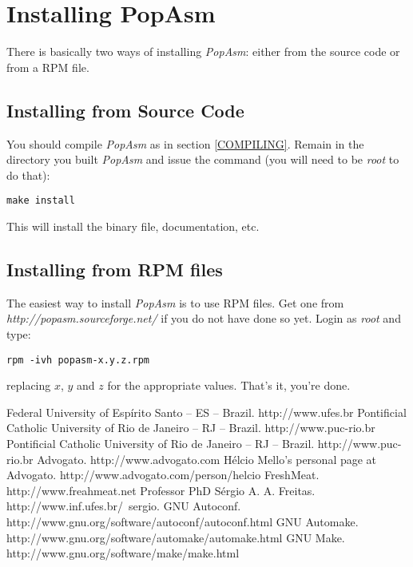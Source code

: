 \documentclass[a4paper,12pt]{book}
\begin{document}
\section{Installing PopAsm}

There is basically two ways of installing \emph{PopAsm}: either from the source code or from a
RPM file.

\subsection{Installing from Source Code}
You should compile \emph{PopAsm} as in section \ref{COMPILING}. Remain in the directory you built
\emph{PopAsm} and issue the command (you will need to be \emph{root} to do that):

\begin{verbatim}
make install
\end{verbatim}

This will install the binary file, documentation, etc.

\subsection{Installing from RPM files}
The easiest way to install \emph{PopAsm} is to use RPM files. Get one from
\emph{http://popasm.sourceforge.net/} if you do not have done so yet. Login as \emph{root} and
type:

\begin{verbatim}
rpm -ivh popasm-x.y.z.rpm
\end{verbatim}

replacing $x$, $y$ and $z$ for the appropriate values. That's it, you're done.

\begin{thebibliography}{9}
 Federal University of Esp\'irito Santo -- ES -- Brazil. http://www.ufes.br
 Pontificial Catholic University of Rio de Janeiro -- RJ -- Brazil. http://www.puc-rio.br
 Pontificial Catholic University of Rio de Janeiro -- RJ -- Brazil. http://www.puc-rio.br
Advogato. http://www.advogato.com
H\'elcio Mello's personal page at Advogato. http://www.advogato.com/person/helcio
FreshMeat. http://www.freahmeat.net
Professor PhD S\'ergio A. A. Freitas. http://www.inf.ufes.br/~sergio.
GNU Autoconf. http://www.gnu.org/software/autoconf/autoconf.html
GNU Automake. http://www.gnu.org/software/automake/automake.html
GNU Make. http://www.gnu.org/software/make/make.html
\end{thebibliography}
\end{document}
